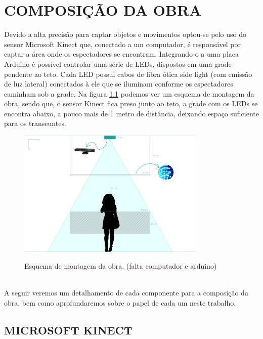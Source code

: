 \chapter{COMPOSIÇÃO DA OBRA}

Devido a alta precisão para captar objetos e movimentos optou-se pelo uso do sensor Microsoft Kinect que, conectado a um computador, é responsável por captar a área onde os espectadores se encontram. Integrando-o a uma placa Arduino é possível controlar uma série de LEDs, dispostos em uma grade pendente ao teto. Cada LED possui cabos de fibra ótica side light (com emissão de luz lateral) conectados à ele que se iluminam conforme os espectadores caminham sob a grade. Na figura \ref{fig:esquema} podemos ver um esquema de montagem da obra, sendo que, o sensor Kinect fica preso junto ao teto, a grade com os LEDs se encontra abaixo, a pouco mais de 1 metro de distância, deixando espaço suficiente para os transeuntes.

\begin{figure}[H]
    \centering
    \caption{Esquema de montagem da obra. (falta computador e arduino)}
	\vspace*{0,2cm}
    \includegraphics[width=0.8\textwidth]{./04-figuras/esquema}
    \label{fig:esquema}
\end{figure}
\vspace*{-0,9cm}
{\raggedright {}}\\

A seguir veremos um detalhamento de cada componente para a composição da obra, bem como aprofundaremos sobre o papel de cada um neste trabalho. 

\section{MICROSOFT KINECT}

